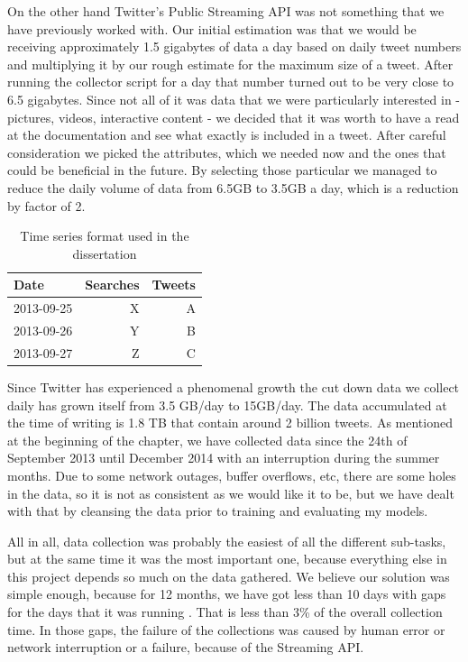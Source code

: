 \documentclass[minf,twoside,singlespacing,parskip,notimes,deptreport]{infthesis} %
\begin{document}
On the other hand Twitter's Public Streaming API was not something that we have previously worked with. Our initial estimation was that we would be receiving approximately 1.5 gigabytes of data a day based on daily tweet numbers and multiplying it by our rough estimate for the maximum size of a tweet. After running the collector script for a day that number turned out to be very close to 6.5 gigabytes. Since not all of it was data that we were particularly interested in - pictures, videos, interactive content - we decided that it was worth to have a read at the documentation and see what exactly is included in a tweet.  After careful consideration we picked the attributes, which we needed now and the ones that could be beneficial in the future. By selecting those particular we managed to reduce the daily volume of data from 6.5GB to 3.5GB a day, which is a reduction by factor of 2. 


\begin{table}[h]
\begin{center}
\begin{tabular}{ l | r  | r }
\textbf{Date} & \textbf{Searches} & \textbf{Tweets} \\ 
\hline
2013-09-25 &  X  & A \\
2013-09-26 &  Y  & B \\
2013-09-27 &  Z & C \\
\end{tabular}
\end{center}
\caption{Time series format used in the dissertation}
\label{ssearches}
\end{table}

Since Twitter has experienced a phenomenal growth the cut down data we collect daily has grown itself from 3.5 GB/day to 15GB/day. The data accumulated at the time of writing is 1.8 TB that contain around 2 billion tweets. As mentioned at the beginning of the chapter, we have collected data since the 24th of September 2013 until December 2014 with an interruption during the summer months. Due to some network outages, buffer overflows, etc, there are some holes in the data, so it is not as consistent as we would like it to be, but we have dealt with that by cleansing the data prior to training and evaluating my models. 


All in all, data collection was probably the easiest of all the different sub-tasks, but at the same time it was the most important one, because everything else in this project depends so much on the data gathered. We believe our solution was simple enough, because for 12 months, we have got less than 10 days with gaps for the days that it was running . That is less than 3\% of the overall collection time. In those gaps, the failure of the collections was caused by human error or network interruption or a failure, because of the Streaming API. 
\end{document}
